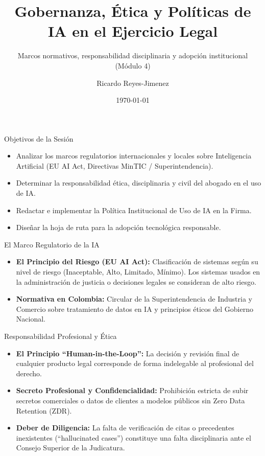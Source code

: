 \documentclass[aspectratio=169]{beamer}
\title[ Gobernanza, Ética y Políticas]{ Gobernanza, Ética y Políticas de IA en el Ejercicio Legal}
\subtitle{ Marcos normativos, responsabilidad disciplinaria y adopción institucional (Módulo 4)}
\author{Ricardo Reyes-Jimenez}
\institute{Universidad de La Sabana}
\date{\today}
\begin{document}
\begin{frame}
  \titlepage
\end{frame}

\usebackgroundtemplate{}


\begin{frame}{Objetivos de la Sesión}
\begin{itemize}
  \item Analizar los marcos regulatorios internacionales y locales sobre Inteligencia Artificial (EU AI Act, Directivas MinTIC / Superintendencia).
  \item Determinar la responsabilidad ética, disciplinaria y civil del abogado en el uso de IA.
  \item Redactar e implementar la Política Institucional de Uso de IA en la Firma.
  \item Diseñar la hoja de ruta para la adopción tecnológica responsable.
\end{itemize}
\end{frame}


\begin{frame}{El Marco Regulatorio de la IA}
\begin{itemize}
  \item \textbf{El Principio del Riesgo (EU AI Act):} Clasificación de sistemas según su nivel de riesgo (Inaceptable, Alto, Limitado, Mínimo). Los sistemas usados en la administración de justicia o decisiones legales se consideran de alto riesgo.
  \item \textbf{Normativa en Colombia:} Circular de la Superintendencia de Industria y Comercio sobre tratamiento de datos en IA y principios éticos del Gobierno Nacional.
\end{itemize}
\end{frame}


\begin{frame}{Responsabilidad Profesional y Ética}
\begin{itemize}
  \item \textbf{El Principio ``Human-in-the-Loop'':} La decisión y revisión final de cualquier producto legal corresponde de forma indelegable al profesional del derecho.
  \item \textbf{Secreto Profesional y Confidencialidad:} Prohibición estricta de subir secretos comerciales o datos de clientes a modelos públicos sin Zero Data Retention (ZDR).
  \item \textbf{Deber de Diligencia:} La falta de verificación de citas o precedentes inexistentes (``hallucinated cases'') constituye una falta disciplinaria ante el Consejo Superior de la Judicatura.
\end{itemize}
\end{frame}
\end{document}
